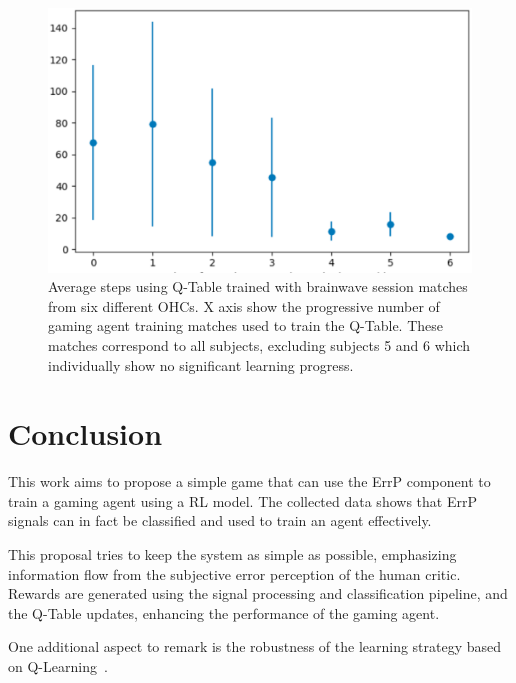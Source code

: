 \documentclass[journal]{IEEEtran}
\begin{document}
{{\begin{figure}[h!]
\centering
\includegraphics[scale=0.4]{Images/Average_steps/all.eps}
\caption{Average steps using Q-Table trained with brainwave session matches from six different OHCs. X axis show the progressive number of gaming agent training matches used to train the Q-Table. These matches correspond to all subjects, excluding subjects 5 and 6 which individually show no significant learning progress.}
\label{fig:avg_steps_all}
\end{figure}

\section{Conclusion}
\label{conclusions}


This work aims to propose a simple game that can use the ErrP component to train a gaming agent using a RL model. The collected data shows that ErrP signals can in fact be classified and used to train an agent effectively.

This proposal tries to keep the system as simple as possible, emphasizing information flow from the subjective error perception of the human critic. Rewards are generated using the signal processing and classification pipeline, and the Q-Table updates, enhancing the performance of the gaming agent.

One additional aspect to remark is the robustness of the learning strategy based on Q-Learning~\cite{Bauer2015,Rubin2012}.  

}}
\end{document}
